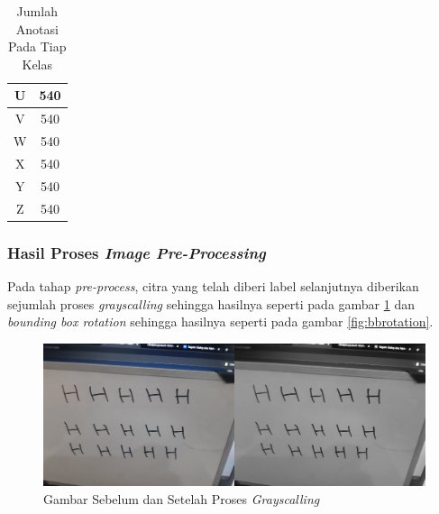 \begin{table}[H]
\begin{center}
\begin{tabular}{|c|c|}
    U                                    & 540                     \\ \hline
    V                                    & 540                     \\ \hline
    W                                    & 540                     \\ \hline
    X                                    & 540                     \\ \hline
    Y                                    & 540                     \\ \hline
    Z                                    & 540                     \\ \hline
    \end{tabular}
  \end{center}
  
  \caption{Jumlah Anotasi Pada Tiap Kelas}
  \label{tb:anotasitiapkelas}
  \end{table}

\subsubsection{Hasil Proses \textit{Image Pre-Processing}}
\label{subsubsec:hasilpreprocess}

Pada tahap \textit{pre-process}, citra yang telah diberi label selanjutnya diberikan sejumlah proses \textit{grayscalling} sehingga hasilnya seperti pada gambar \ref{fig:grayscallingdataset} dan \textit{bounding box rotation} sehingga hasilnya seperti pada gambar \ref*{fig:bbrotation}.

\begin{figure}[H]
  \centering
  \includegraphics[scale=0.35]{gambar/grayscalling.png}
  \caption{Gambar Sebelum dan Setelah Proses \textit{Grayscalling}}
  \label{fig:grayscallingdataset}
\end{figure}

